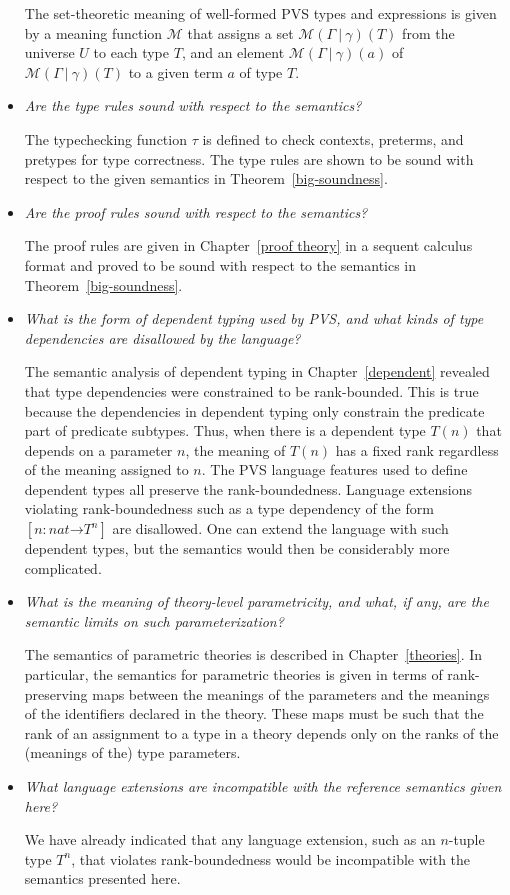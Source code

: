 \documentclass [12pt,twoside]{cslreport}
\newcommand{\aro}{\mathord\rightarrow} %
\newcommand{\funtype}[2]{[#1 \aro #2]}
\newcommand{\Mgamma}[1]{{\mathcal M}(\Gamma\vbar\gamma)(#1)}
\newcommand{\vbar}{\ |\ }
\begin{document}
\begin{itemize}
The set-theoretic meaning of well-formed PVS types and expressions
is given by  a meaning function
$\mathcal{M}$ that assigns a set $\Mgamma{T}$ from the universe $U$ to each type
$T$,  and an element $\Mgamma{a}$ of $\Mgamma{T}$ to a given term $a$ of type
$T$\@.

\item {\em Are the type rules sound with respect to the semantics? }

The typechecking function $\tau$ is defined to check contexts,
preterms, and pretypes for type correctness.    The type rules are shown
to be sound with respect to the given semantics in
Theorem~\ref{big-soundness}\@. 

\item {\em Are the proof rules sound with respect to the semantics?}

The proof rules are given in Chapter~\ref{proof theory} in a sequent
calculus format and proved to be sound with respect to the semantics in
Theorem~\ref{big-soundness}\@.  

\item {\em What is the form of dependent typing used by PVS, and
what kinds of type dependencies are disallowed by the language?}

The semantic analysis of dependent typing in Chapter~\ref{dependent}
revealed that type dependencies were constrained to be rank-bounded.  This
is true because the dependencies in dependent typing only constrain the
predicate part of predicate subtypes. Thus, when there is a dependent type
$T(n)$ that depends on a parameter $n$, the meaning of $T(n)$ has a fixed
rank regardless of the meaning assigned to $n$\@.  The PVS language
features used to define dependent types all preserve the rank-boundedness.
Language extensions violating rank-boundedness such as a type dependency
of the form $\funtype{n : nat}{T^n}$ are disallowed.  One can extend the
language with such dependent types, but the semantics would then be
considerably more complicated.

\item {\em What is the meaning of theory-level parametricity, and
what, if any, are the semantic limits on such parameterization?}

The semantics of parametric theories is described in
Chapter~\ref{theories}\@.  In particular, the semantics for parametric
theories is given in terms of rank-preserving maps between the meanings of
the parameters and the meanings of the identifiers declared in the theory.
These maps must be such that the rank of an assignment to a type in a theory
depends only on the ranks of the (meanings of the) type parameters.

\item {\em What language extensions are incompatible with the reference
semantics given here?}

We have already indicated that any language extension, such as an $n$-tuple
type $T^n$, that violates rank-boundedness would be incompatible with the
semantics presented here.
\end{itemize}
\end{document}
